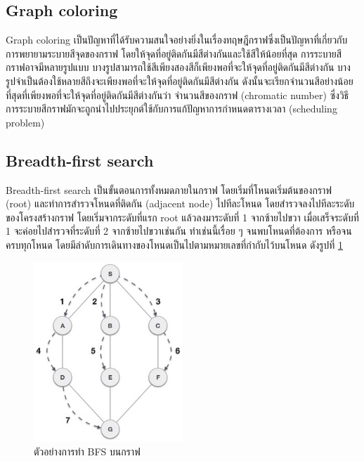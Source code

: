 \subsection{Graph coloring}
 
Graph coloring เป็นปัญหาที่ได้รับความสนใจอย่างยิ่งในเรื่องทฤษฎีกราฟซึ่งเป็นปัญหาที่เกี่ยวกับการพยายามระบายสีจุดของกราฟ โดยให้จุดที่อยู่ติดกันมีสีต่างกันและใช้สีให้น้อยที่สุด
การระบายสีกราฟอาจมีหลายรูปแบบ บางรูปสามารถใช้สีเพียงสองสีก็เพียงพอที่จะให้จุดที่อยู่ติดกันมีสีต่างกัน บางรูปจำเป็นต้องใช้หลายสีถึงจะเพียงพอที่จะให้จุดที่อยู่ติดกันมีสีต่างกัน 
ดังนั้นจะเรียกจำนวนสีอย่างน้อยที่สุดที่เพียงพอที่จะให้จุดที่อยู่ติดกันมีสีต่างกันว่า จำนวนสีของกราฟ (chromatic number) ซึ่งวิธีการระบายสีกราฟมักจะถูกนำไปประยุกต์ใช้กับการแก้ปัญหาการกำหนดตารางเวลา (scheduling problem) 

\subsection{Breadth-first search}
Breadth-first search เป็นขั้นตอนการทั้งหมดภายในกราฟ โดยเริ่มที่โหนดเริ่มต้นของกราฟ (root) และทำการสำรวจโหนดที่ติดกัน (adjacent node) ไปทีละโหนด โดยสำรวจลงไปทีละระดับของโครงสร้างกราฟ โดยเริ่มจากระดับที่แรก root แล้วลงมาระดับที่ 1 จากซ้ายไปขวา เมื่อเสร็จระดับที่ 1 จะค่อยไปสำรวจที่ระดับที่ 2 จากซ้ายไปขวาเช่นกัน ทําเช่นนี้เรื่อย ๆ
จนพบโหนดที่ต้องการ หรือจนครบทุกโหนด โดยมีลําดับการเดินทางของโหนดเป็นไปตามหมายเลขที่กํากับไว้บนโหนด
ดังรูปที่ \ref{fig:graph_bfs}
\begin{figure}
  \begin{center}
    \includegraphics[width=0.5\textwidth]{images/breadth_first_traversal.jpg}
  \end{center}
  \caption[ตัวอย่างการทำ BFS บนกราฟ]{ตัวอย่างการทำ BFS บนกราฟ}
  \label{fig:graph_bfs}     
\end{figure}
